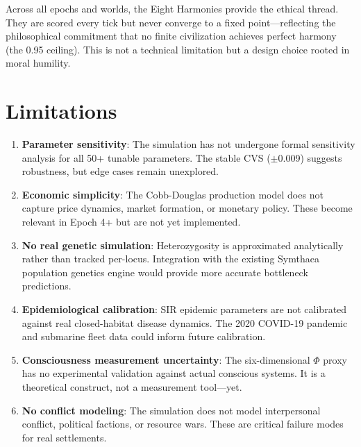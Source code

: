 \documentclass[12pt,a4paper]{article}
\begin{document}
Across all epochs and worlds, the Eight Harmonies provide the ethical thread. They are scored every tick but never converge to a fixed point---reflecting the philosophical commitment that no finite civilization achieves perfect harmony (the 0.95 ceiling). This is not a technical limitation but a design choice rooted in moral humility.


\section{Limitations}

\begin{enumerate}    \item \textbf{Parameter sensitivity}: The simulation has not undergone formal sensitivity analysis for all 50+ tunable parameters. The stable CVS ($\pm$0.009) suggests robustness, but edge cases remain unexplored.
    \item \textbf{Economic simplicity}: The Cobb-Douglas production model does not capture price dynamics, market formation, or monetary policy. These become relevant in Epoch 4+ but are not yet implemented.
    \item \textbf{No real genetic simulation}: Heterozygosity is approximated analytically rather than tracked per-locus. Integration with the existing Symthaea population genetics engine would provide more accurate bottleneck predictions.
    \item \textbf{Epidemiological calibration}: SIR epidemic parameters are not calibrated against real closed-habitat disease dynamics. The 2020 COVID-19 pandemic and submarine fleet data could inform future calibration.
    \item \textbf{Consciousness measurement uncertainty}: The six-dimensional $\Phi$ proxy has no experimental validation against actual conscious systems. It is a theoretical construct, not a measurement tool---yet.
    \item \textbf{No conflict modeling}: The simulation does not model interpersonal conflict, political factions, or resource wars. These are critical failure modes for real settlements.
\end{enumerate}

\end{document}
